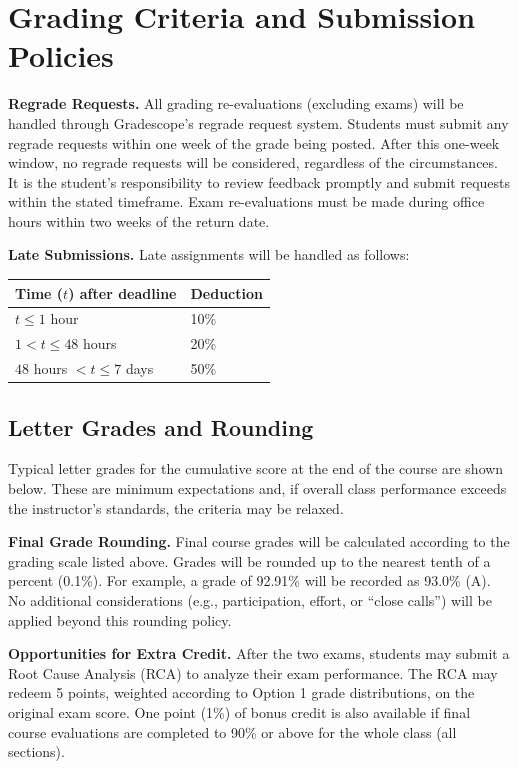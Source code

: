\section*{Grading Criteria and Submission Policies}
{\small}

\textbf{Regrade Requests.} All grading re-evaluations (excluding exams) will be handled through Gradescope's regrade request system. Students must submit any regrade requests within one week of the grade being posted. After this one-week window, no regrade requests will be considered, regardless of the circumstances. It is the student's responsibility to review feedback promptly and submit requests within the stated timeframe. Exam re-evaluations must be made during office hours within two weeks of the return date.

\textbf{Late Submissions.} Late assignments will be handled as follows:
\par\smallskip\noindent
\begin{tabular}{@{}L{0.35\textwidth}L{0.20\textwidth}@{}}
\toprule
Time ($t$) after deadline & Deduction \\
\midrule
$t \leq 1$ hour & 10\% \\
$1 < t \leq 48$ hours & 20\% \\
$48$ hours $< t \leq 7$ days & 50\% \\
\bottomrule
\end{tabular}
\par\vspace{0.5em}

\newpage
\subsection*{Letter Grades and Rounding}
Typical letter grades for the cumulative score at the end of the course are shown below. These are minimum expectations and, if overall class performance exceeds the instructor's standards, the criteria may be relaxed.

{\small}

\textbf{Final Grade Rounding.} Final course grades will be calculated according to the grading scale listed above. Grades will be rounded up to the nearest tenth of a percent (0.1\%). For example, a grade of 92.91\% will be recorded as 93.0\% (A). No additional considerations (e.g., participation, effort, or ``close calls'') will be applied beyond this rounding policy.

\textbf{Opportunities for Extra Credit.} After the two exams, students may submit a Root Cause Analysis (RCA) to analyze their exam performance. The RCA may redeem 5 points, weighted according to Option 1 grade distributions, on the original exam score. One point (1\%) of bonus credit is also available if final course evaluations are completed to 90\% or above for the whole class (all sections).


